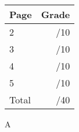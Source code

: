 \documentclass[12pt]{article}
\newcommand{\skipline}{\vspace{12pt}}
\begin{document}
\begin{table}[hbt]
\begin{center}
\begin{tabular}{|l|r|} \hline
Page&Grade\\
\hline \hline
\cline{1-2} 2 & \enspace\enspace\enspace\enspace\enspace\enspace/10\\
\cline{1-2} 3 & \enspace\enspace\enspace\enspace\enspace\enspace/10\\
\cline{1-2} 4 & \enspace\enspace\enspace\enspace\enspace\enspace/10\\
\cline{1-2} 5 & \enspace\enspace\enspace\enspace\enspace\enspace/10\\
\cline{1-2} Total & \enspace\enspace\enspace\enspace\enspace\enspace/40\\
\hline
\end{tabular}

\skipline

\skipline

\skipline

A
\end{center}
\end{table}
\newpage
\end{document}
